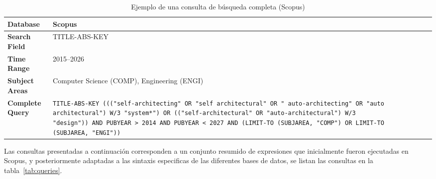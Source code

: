 \documentclass[12pt, letterpaper, oneside]{book}
\begin{document}
 \begin{table}[ht]
 	\centering
 	\caption{Ejemplo de una consulta de búsqueda completa (Scopus)}
 	\label{tab:example_query}
 	\begin{tabularx}{\textwidth}{|l|X|}
 		\hline
 		\textbf{Database} & Scopus \\ \hline
 		\textbf{Search Field} & TITLE-ABS-KEY \\ \hline
 		\textbf{Time Range} & 2015--2026 \\ \hline
 		\textbf{Subject Areas} & Computer Science (COMP), Engineering (ENGI) \\ \hline
 		\textbf{Complete Query} &
 		\texttt{TITLE-ABS-KEY ((("self-architecting"\ OR "self architectural"\ OR\ "\ auto-architecting"\ OR\ "auto architectural")\ W/3\ "system*")\ OR\ (("self-architectural"\ OR\ "auto-architectural")\ W/3 "design"))\ AND\ PUBYEAR\ >\ 2014\ AND\ PUBYEAR\ <\ 2027\ AND\ (LIMIT-TO\ (SUBJAREA,\ "COMP")\ OR\ LIMIT-TO (SUBJAREA,\ "ENGI"))} \\ \hline
 	\end{tabularx}
 \end{table}
 
 Las consultas presentadas a continuación corresponden a un conjunto resumido de expresiones que inicialmente fueron ejecutadas en Scopus, y posteriormente adaptadas a las sintaxis especificas de las diferentes bases de datos, se listan las consultas en la tabla~\ref{tab:queries}.
 
 
 
\end{document}
